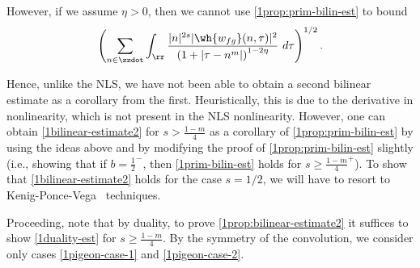 However, if we assume $\eta >0$, then
we cannot use \cref{1prop:prim-bilin-est} to bound
\begin{equation*}
	\begin{split}
		\left ( \sum_{n \in \zzdot}\int_{\rr} \frac{|n|^{2s} | \wh{w_{fg}}(n, \tau) 
		|^2}{\left( 1 + | \tau - n^m | \right)^{1 - 2\eta}}\ d \tau
		\right)^{1/2}. 
	\end{split}
\end{equation*}
\begin{framed}
\begin{remark}
Hence, unlike the NLS, we have not been able to obtain a second bilinear
estimate as a corollary from the first. Heuristically, this is due to the
derivative in nonlinearity, which is not present in the NLS nonlinearity.
However, one can obtain \eqref{1bilinear-estimate2} for $s>\frac{1-m}{4}$ as a
corollary of \cref{1prop:prim-bilin-est} by using the ideas
above and by modifying the proof of \cref{1prop:prim-bilin-est} slightly (i.e.,
showing that if $b = \frac{1}{2}^-$, then \eqref{1prim-bilin-est} holds for
$s\ge \frac{1-m}{4}^+$). To show that \eqref{1bilinear-estimate2} holds for the
case $s=1/2$, we will have to resort to Kenig-Ponce-Vega~\cite{Kenig:1996aa} techniques.
\end{remark}
\end{framed}
%
%
Proceeding, note that by duality, to prove \cref{1prop:bilinear-estimate2} it
suffices to show \eqref{1duality-est} for $s \ge \frac{1-m}{4}$. By the symmetry of the convolution, we
consider only cases \eqref{1pigeon-case-1} and \eqref{1pigeon-case-2}.
%
%
